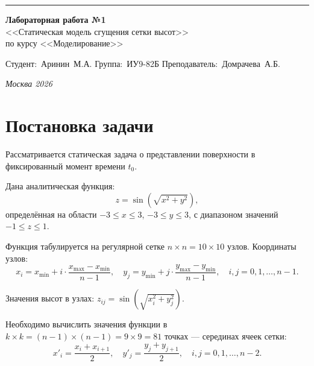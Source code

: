 \documentclass[a4paper, 14pt]{extarticle}
\begin{document}
\begin{titlepage}
\vspace*{-16pt}
\hspace{30pt}\rule{0.866\textwidth}{0.4pt}

\vspace{11em}

\begin{center}
\Large {\bf Лабораторная работа №1} \\ 
\large <<Статическая модель сгущения сетки высот>> \\
\large {по курсу <<Моделирование>>} \\

\end{center}\normalsize

\vspace{8em}

\vbox{%
\hfill%
\vbox{%
\hbox{Студент: Аринин М.А.}%
\hbox{Группа: ИУ9-82Б}%
\hbox{Преподаватель: Домрачева А.Б.}%
}%
} 

\bigskip

\vfill


\begin{center}
\textsl{Москва 2026}
\end{center}
\end{titlepage}


\renewcommand{\ttdefault}{pcr}

\setlength{\tabcolsep}{3pt}

\newpage
\setcounter{page}{2}

\section{Постановка задачи}
Рассматривается статическая задача о представлении поверхности в фиксированный момент времени $t_0$.

Дана аналитическая функция:
\[
z = \sin\!\left(\sqrt{x^2 + y^2}\right),
\]
определённая на области $-3 \leq x \leq 3$, $-3 \leq y \leq 3$, с диапазоном значений $-1 \leq z \leq 1$.

Функция табулируется на регулярной сетке $n \times n = 10 \times 10$ узлов. Координаты узлов:
\[
x_i = x_{\min} + i \cdot \frac{x_{\max} - x_{\min}}{n - 1}, \quad y_j = y_{\min} + j \cdot \frac{y_{\max} - y_{\min}}{n - 1}, \quad i, j = 0, 1, \ldots, n-1.
\]

Значения высот в узлах: $z_{ij} = \sin\!\left(\sqrt{x_i^2 + y_j^2}\right)$.

Необходимо вычислить значения функции в $k \times k = (n-1) \times (n-1) = 9 \times 9 = 81$ точках --- серединах ячеек сетки:
\[
x'_{i} = \frac{x_i + x_{i+1}}{2}, \quad y'_{j} = \frac{y_j + y_{j+1}}{2}, \quad i, j = 0, 1, \ldots, n-2.
\]
\end{document}
